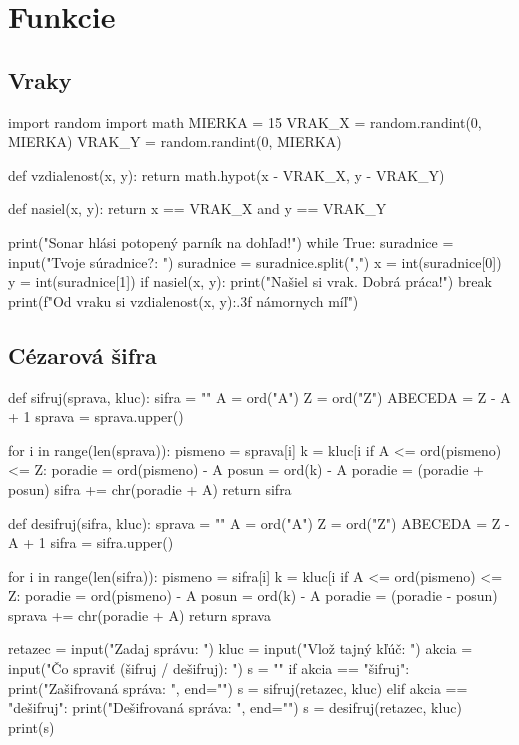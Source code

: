 \section{Funkcie}
\subsection{Vraky}
\begin{solution}
import random
import math
MIERKA = 15
VRAK_X = random.randint(0, MIERKA)
VRAK_Y = random.randint(0, MIERKA)

def vzdialenost(x, y):
    return math.hypot(x - VRAK_X, y - VRAK_Y)
  
def nasiel(x, y):
    return x == VRAK_X and y == VRAK_Y

print("Sonar hlási potopený parník na dohľad!")
while True:
    suradnice = input("Tvoje súradnice?: ")
    suradnice = suradnice.split(",")
    x = int(suradnice[0])
    y = int(suradnice[1])
    if nasiel(x, y):
        print("Našiel si vrak. Dobrá práca!")
        break
    print(f"Od vraku si {vzdialenost(x, y):.3f} námornych míľ")
\end{solution}

\subsection{Cézarová šifra}
\begin{solution}
def sifruj(sprava, kluc):
    sifra = ""
    A = ord("A")
    Z = ord("Z")
    ABECEDA = Z - A + 1
    sprava = sprava.upper()

    for i in range(len(sprava)):
        pismeno = sprava[i]
        k = kluc[i %
        if A <= ord(pismeno) <= Z:
            poradie = ord(pismeno) - A
            posun = ord(k) - A
            poradie = (poradie + posun) %
            sifra += chr(poradie + A)
    return sifra

def desifruj(sifra, kluc):
    sprava = ""
    A = ord("A")
    Z = ord("Z")
    ABECEDA = Z - A + 1
    sifra = sifra.upper()

    for i in range(len(sifra)):
        pismeno = sifra[i]
        k = kluc[i %
        if A <= ord(pismeno) <= Z:
            poradie = ord(pismeno) - A
            posun = ord(k) - A
            poradie = (poradie - posun) %
            sprava += chr(poradie + A)
    return sprava

retazec = input("Zadaj správu: ")
kluc = input("Vlož tajný kľúč: ")
akcia = input("Čo spraviť (šifruj / dešifruj): ")
s = ""
if akcia == "šifruj":
    print("Zašifrovaná správa: ", end="")
    s = sifruj(retazec, kluc)
elif akcia == "dešifruj":
    print("Dešifrovaná správa: ", end="")
    s = desifruj(retazec, kluc)
print(s)
\end{solution}

